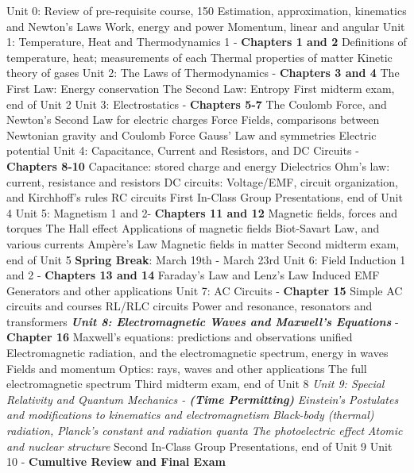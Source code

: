 \documentclass[10pt]{article}
\begin{document}
\begin{outline}[enumerate]
\1 Unit 0: Review of pre-requisite course, 150
\2 Estimation, approximation, kinematics and Newton's Laws
\2 Work, energy and power
\2 Momentum, linear and angular
\1 Unit 1: Temperature, Heat and Thermodynamics 1 - \textbf{Chapters 1 and 2}
\2 Definitions of temperature, heat; measurements of each
\2 Thermal properties of matter
\2 Kinetic theory of gases
\1 Unit 2: The Laws of Thermodynamics - \textbf{Chapters 3 and 4}
\2 The First Law: Energy conservation 
\2 The Second Law: Entropy
\1 First midterm exam, end of Unit 2
\1 Unit 3: Electrostatics - \textbf{Chapters 5-7}
\2 The Coulomb Force, and Newton's Second Law for electric charges
\2 Force Fields, comparisons between Newtonian gravity and Coulomb Force
\2 Gauss' Law and symmetries
\2 Electric potential
\1 Unit 4: Capacitance, Current and Resistors, and DC Circuits - \textbf{Chapters 8-10}
\2 Capacitance: stored charge and energy
\2 Dielectrics
\2 Ohm's law: current, resistance and resistors
\2 DC circuits: Voltage/EMF, circuit organization, and Kirchhoff's rules
\2 RC circuits
\1 First In-Class Group Presentations, end of Unit 4
\1 Unit 5: Magnetism 1 and 2- \textbf{Chapters 11 and 12}
\2 Magnetic fields, forces and torques
\2 The Hall effect
\2 Applications of magnetic fields
\2 Biot-Savart Law, and various currents
\2 Amp\`{e}re's Law
\2 Magnetic fields in matter
\1 Second midterm exam, end of Unit 5
\1 \textbf{Spring Break}: March 19th - March 23rd
\1 Unit 6: Field Induction 1 and 2 - \textbf{Chapters 13 and 14}
\2 Faraday's Law and Lenz's Law
\2 Induced EMF
\2 Generators and other applications
\1 Unit 7: AC Circuits - \textbf{Chapter 15}
\2 Simple AC circuits and courses
\2 RL/RLC circuits
\2 Power and resonance, resonators and transformers
\1 \textit{\textbf{ Unit 8: Electromagnetic Waves and Maxwell's Equations}} - \textbf{Chapter 16}
\2 Maxwell's equations: predictions and observations unified
\2 Electromagnetic radiation, and the electromagnetic spectrum, energy in waves
\2 Fields and momentum
\2 Optics: rays, waves and other applications
\2 The full electromagnetic spectrum
\1 Third midterm exam, end of Unit 8
\1 \textit{Unit 9: Special Relativity and Quantum Mechanics - \textbf{(Time Permitting)}}
\2 \textit{Einstein's Postulates and modifications to kinematics and electromagnetism}
\2 \textit{Black-body (thermal) radiation, Planck's constant and radiation quanta}
\2 \textit{The photoelectric effect}
\2 \textit{Atomic and nuclear structure}
\1 Second In-Class Group Presentations, end of Unit 9
\1 Unit 10 - \textbf{Cumultive Review and Final Exam}
\end{outline}
\end{document}
